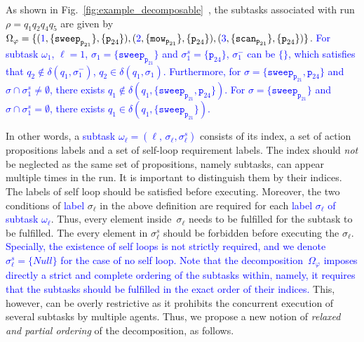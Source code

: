 \begin{example}
	\label{example:subtask}
        As shown in Fig.~\ref{fig:example_decomposable}~,
          the subtasks associated with run $\rho=q_1q_2q_4q_5$ are given
          by~$\Omega_\varphi=\{(\textcolor{blue}{1},\{\texttt{sweep}_{\texttt{p}_{21}}\},\{\texttt{p}_{24}\}),
         \\ (\textcolor{blue}{2},\{\texttt{mow}_{\texttt{p}_{21}}\}, \{\texttt{p}_{24}\}),
          (\textcolor{blue}{3}, \{\texttt{scan}_{\texttt{p}_{21}}\}, \{\texttt{p}_{24}\})\}$.
          \textcolor{blue}{For subtask $\omega_1$, $\ell=1$, $\sigma_1=\{\texttt{sweep}_{\texttt{p}_{21}}\}$ and $\sigma^s_1=\{\texttt{p}_{24}\}$,
          $\sigma^-_1$ can be $\{\}$, which satisfies that $q_2\notin
          \delta(q_1,\sigma^-_1)$, $q_2\in\delta(q_1,\sigma_1)$.
          Furthermore, for $\sigma=\{\texttt{sweep}_{\texttt{p}_{21}}, \texttt{p}_{24}\}$ and $\sigma\cap\sigma^s_1\neq\emptyset$, there exists $q_1\notin \delta(q_1, \{\texttt{sweep}_{\texttt{p}_{21}}, \texttt{p}_{24}\})$.
          For $\sigma=\{\texttt{sweep}_{\texttt{p}_{21}}\}$ and
          $\sigma\cap\sigma^s_1=\emptyset$, there exists $q_1\in \delta(q_1,\{\texttt{sweep}_{\texttt{p}_{21}}\})$.}
\end{example}

In other words, a \textcolor{blue}{subtask $\omega_\ell=(\ell,\,\sigma_\ell,\sigma^s_\ell)$} consists of its index, a set of action propositions labels and
a set of self-loop requirement labels.
The index should \emph{not} be neglected as the same set of propositions, namely subtasks,
can appear multiple times in the run.
It is important to distinguish them by their indices. The labels of self loop should be satisfied
before executing. Moreover, the two conditions of \textcolor{blue}{label} $\sigma_\ell$ in the above definition are required for 
each \textcolor{blue}{label $\sigma_\ell$ of subtask $\omega_\ell$}.
Thus, every element inside~$\sigma_\ell$ needs to be fulfilled for the subtask to be fulfilled.
The every element in $\sigma^s_\ell$ should be forbidden before
executing the $\sigma_\ell$. \textcolor{blue}{Specially, the
existence of self loops is not strictly required,
and we denote $\sigma^s_\ell=\{Null\}$ for the case
of no self loop.
Note that the decomposition~$\Omega_{\varphi}$ imposes directly a {strict and complete} ordering of the subtasks within,
namely, it requires that the subtasks should be fulfilled in the exact order of their indices.}
This, however, can be overly restrictive as it prohibits the concurrent execution of several subtasks by multiple agents.
Thus, we propose a new notion of \emph{relaxed and partial ordering} of the decomposition,
as follows.

